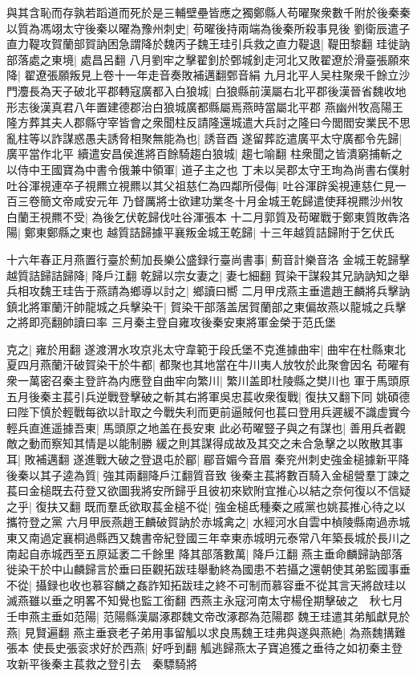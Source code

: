 與其含恥而存孰若蹈道而死於是三輔壁壘皆應之獨鄭縣人苟曜聚衆數千附於後秦秦以質為馮翊太守後秦以曜為豫州刺史|{
	苟曜後持兩端為後秦所殺事見後}
劉衛辰遣子直力鞮攻賀蘭部賀訥困急謂降於魏丙子魏王珪引兵救之直力鞮退|{
	鞮田黎翻}
珪徙訥部落處之東境|{
	處昌呂翻}
八月劉牢之擊翟釗於鄄城釗走河北又敗翟遼於滑臺張願來降|{
	翟遼張願叛見上卷十一年走音奏敗補邁翻鄄音絹}
九月北平人吴柱聚衆千餘立沙門灋長為天子破北平郡轉寇廣都入白狼城|{
	白狼縣前漢屬右北平郡後漢晉省魏收地形志後漢真君八年置建德郡治白狼城廣都縣屬焉燕時當屬北平郡}
燕幽州牧高陽王隆方葬其夫人郡縣守宰皆會之衆聞柱反請隆還城遣大兵討之隆曰今閭閻安業民不思亂柱等以詐謀惑愚夫誘脅相聚無能為也|{
	誘音酉}
遂留葬訖遣廣平太守廣都令先歸|{
	廣平當作北平}
續遣安昌侯進將百餘騎趨白狼城|{
	趨七喻翻}
柱衆聞之皆潰窮捕斬之　以侍中王國寶為中書令俄兼中領軍|{
	道子主之也}
丁未以吴郡太守王珣為尚書右僕射　吐谷渾視連卒子視羆立視羆以其父祖慈仁為四鄰所侵侮|{
	吐谷渾辟奚視連慈仁見一百三卷簡文帝咸安元年}
乃督厲將士欲建功業冬十月金城王乾歸遣使拜視羆沙州牧白蘭王視羆不受|{
	為後乞伏乾歸伐吐谷渾張本}
十二月郭質及苟曜戰于鄭東質敗犇洛陽|{
	鄭東鄭縣之東也}
越質詰歸據平襄叛金城王乾歸|{
	十三年越質詰歸附于乞伏氏}


十六年春正月燕置行臺於薊加長樂公盛録行臺尚書事|{
	薊音計樂音洛}
金城王乾歸擊越質詰歸詰歸降|{
	降戶江翻}
乾歸以宗女妻之|{
	妻七細翻}
賀染干謀殺其兄訥訥知之舉兵相攻魏王珪告于燕請為鄉導以討之|{
	鄉讀曰嚮}
二月甲戌燕主垂遣趙王麟將兵擊訥鎮北將軍蘭汗帥龍城之兵擊染干|{
	賀染干部落盖居賀蘭部之東偏故燕以龍城之兵擊之將即亮翻帥讀曰率}
三月秦主登自雍攻後秦安東將軍金榮于范氏堡

克之|{
	雍於用翻}
遂渡渭水攻京兆太守韋範于段氏堡不克進據曲牢|{
	曲牢在杜縣東北}
夏四月燕蘭汗破賀染干於牛都|{
	都聚也其地當在牛川夷人放牧於此聚會因名}
苟曜有衆一萬密召秦主登許為内應登自曲牢向繁川|{
	繁川盖即杜陵縣之樊川也}
軍于馬頭原五月後秦主萇引兵逆戰登擊破之斬其右將軍吳忠萇收衆復戰|{
	復扶又翻下同}
姚碩德曰陛下慎於輕戰每欲以計取之今戰失利而更前逼賊何也萇曰登用兵遲緩不識虚實今輕兵直進遥據吾東|{
	馬頭原之地盖在長安東}
此必苟曜豎子與之有謀也|{
	善用兵者觀敵之動而察知其情是以能制勝}
緩之則其謀得成故及其交之未合急擊之以敗散其事耳|{
	敗補邁翻}
遂進戰大破之登退屯於郿|{
	郿音媚今音眉}
秦兖州刺史強金槌據新平降後秦以其子逵為質|{
	強其兩翻降戶江翻質音致}
後秦主萇將數百騎入金槌營羣丁諫之萇曰金槌既去苻登又欲圖我將安所歸乎且彼初來欵附宜推心以結之奈何復以不信疑之乎|{
	復扶又翻}
既而羣氐欲取萇金槌不從|{
	強金槌氐種秦之戚黨也姚萇推心待之以攜符登之黨}
六月甲辰燕趙王麟破賀訥於赤城禽之|{
	水經河水自雲中楨陵縣南過赤城東又南過定襄桐過縣西又魏書帝紀登國三年幸東赤城明元泰常八年築長城於長川之南起自赤城西至五原延袤二千餘里}
降其部落數萬|{
	降戶江翻}
燕主垂命麟歸訥部落徙染干於中山麟歸言於垂曰臣觀拓跋珪舉動終為國患不若攝之還朝使其弟監國事垂不從|{
	攝録也收也慕容麟之姦詐知拓跋珪之終不可制而慕容垂不從其言天將啟珪以滅燕雖以垂之明畧不知覺也監工銜翻}
西燕主永寇河南太守楊佺期擊破之　秋七月壬申燕主垂如范陽|{
	范陽縣漢屬涿郡魏文帝改涿郡為范陽郡}
魏王珪遣其弟觚獻見於燕|{
	見賢遍翻}
燕主垂衰老子弟用事留觚以求良馬魏王珪弗與遂與燕絶|{
	為燕魏搆難張本}
使長史張衮求好於西燕|{
	好呼到翻}
觚逃歸燕太子寶追獲之垂待之如初秦主登攻新平後秦主萇救之登引去　秦驃騎將

